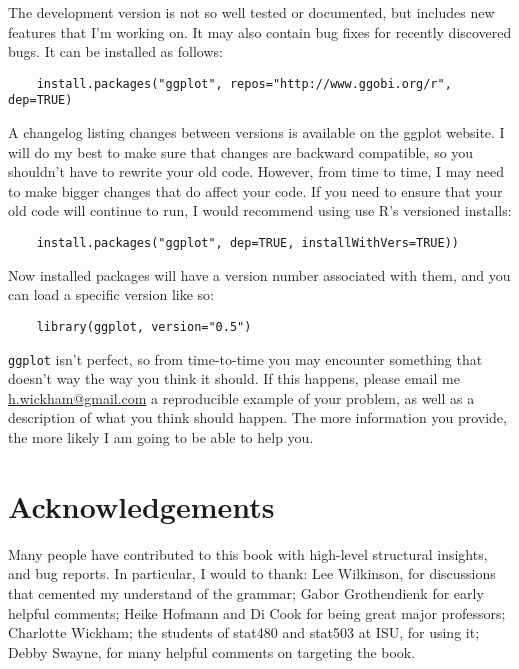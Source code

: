 The development version is not so well tested or documented, but includes new features that I'm working on.  It may also contain bug fixes for recently discovered bugs.  It can be installed as follows:

\begin{verbatim}
	install.packages("ggplot", repos="http://www.ggobi.org/r", dep=TRUE)
\end{verbatim}

A changelog listing changes between versions is available on the ggplot website.  I will do my best to make sure that changes are backward compatible, so you shouldn't have to rewrite your old code.  However, from time to time, I may need to make bigger changes that do affect your code.  If you need to ensure that your old code will continue to run, I would recommend using use R's versioned installs:

\begin{verbatim}
	install.packages("ggplot", dep=TRUE, installWithVers=TRUE))
\end{verbatim}

Now installed packages will have a version number associated with them, and you can load a specific version like so:

\begin{verbatim}
	library(ggplot, version="0.5")
\end{verbatim}

{\tt ggplot} isn't perfect, so from time-to-time you may encounter something that doesn't way the way you think it should.  If this happens, please email me \href{mailto:h.wickham@gmail.com}{h.wickham@gmail.com} a reproducible example of your problem, as well as a description of what you think should happen.  The more information you provide, the more likely I am going to be able to help you.

% 

\section{Acknowledgements}\label{sec:acknolwedgements}

Many people have contributed to this book with high-level structural insights, and bug reports.  In particular, I would to thank: Lee Wilkinson, for discussions that cemented my understand of the grammar; Gabor Grothendienk for early helpful comments; Heike Hofmann and Di Cook for being great major professors; Charlotte Wickham; the students of stat480 and stat503 at ISU, for using it; Debby Swayne, for many helpful comments on targeting the book.


